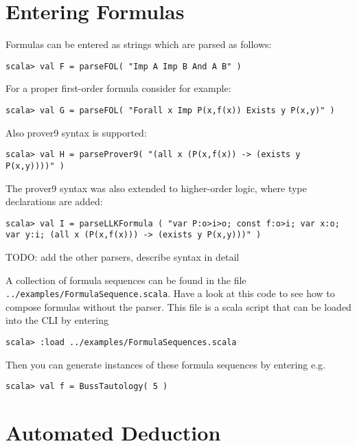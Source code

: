 \documentclass[a4paper,11pt]{article}
\newcommand{\cli}[1]{{\tt {#1}}}
\newenvironment{meta}{\color{red}}{\color{black}}
\begin{document}

\section{Entering Formulas}\label{sec.entering_formulas}

Formulas can be entered as strings which are parsed as follows:
%
\begin{lstlisting}
scala> val F = parseFOL( "Imp A Imp B And A B" )
\end{lstlisting}
%
For a proper first-order formula consider for example:
%
\begin{lstlisting}
scala> val G = parseFOL( "Forall x Imp P(x,f(x)) Exists y P(x,y)" )
\end{lstlisting}
%
Also prover9 syntax\cite{Prover9Input} is supported: 
%
\begin{lstlisting}
scala> val H = parseProver9( "(all x (P(x,f(x)) -> (exists y P(x,y))))" )
\end{lstlisting}
%
The prover9 syntax was also extended to higher-order logic, where type declarations are added:
%
\begin{lstlisting}
scala> val I = parseLLKFormula ( "var P:o>i>o; const f:o>i; var x:o; var y:i; (all x (P(x,f(x))) -> (exists y P(x,y)))" )
\end{lstlisting}


\begin{meta}
TODO: add the other parsers, describe syntax in detail
\end{meta}

A collection of formula sequences can be found in the file \cli{../examples/FormulaSequence.scala}.
Have a look at this code to see how to compose formulas without the parser. This file is
a scala script that can be loaded into the CLI by entering
%
\begin{lstlisting}
scala> :load ../examples/FormulaSequences.scala
\end{lstlisting}
%
Then you can generate instances of these formula sequences by entering e.g.
%
\begin{lstlisting}
scala> val f = BussTautology( 5 )
\end{lstlisting}



\section{Automated Deduction}
  
\end{document}
